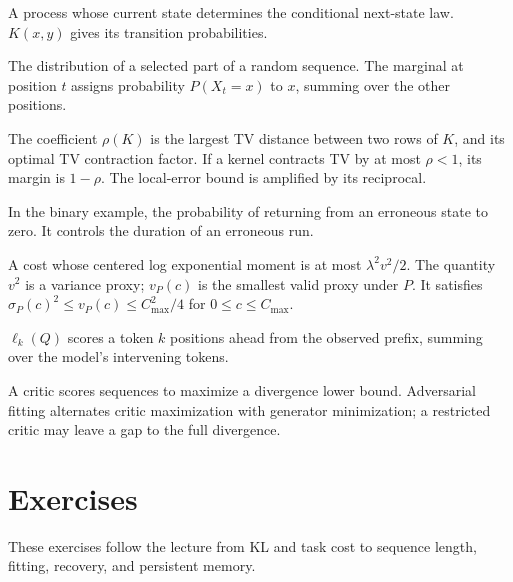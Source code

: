 \documentclass[11pt,twoside]{article}
\theoremstyle{definition}
\theoremstyle{remark}
\begin{document}
\begin{description}[style=nextline,leftmargin=1.5em,labelindent=0pt,
  itemsep=0.15em,parsep=0pt]
A process whose current state determines the conditional next-state
law. \(K(x,y)\) gives its transition probabilities.
\item[Marginal law]
The distribution of a selected part of a random sequence.
The marginal at position \(t\) assigns probability \(P(X_t=x)\)
to \(x\), summing over the other positions.
\item[Dobrushin ergodicity coefficient; contraction margin]
The coefficient \(\rho(K)\) is the largest TV distance between two rows
of \(K\), and its optimal TV contraction factor.
If a kernel contracts TV by at most \(\rho<1\), its margin is
\(1-\rho\). The local-error bound is amplified by its reciprocal.
\item[Recovery]
In the binary example, the probability of returning from an erroneous
state to zero. It controls the duration of an erroneous run.
\item[Subgaussian cost]
A cost whose centered log exponential moment is at most
\(\lambda^2v^2/2\). The quantity \(v^2\) is a variance proxy;
\(v_P(c)\) is the smallest valid proxy under \(P\).
It satisfies \(\sigma_P(c)^2\le v_P(c)\le C_{\max}^2/4\)
for \(0\le c\le C_{\max}\).
\item[\(k\)-step prediction loss]
\(\ell_k(Q)\) scores a token \(k\) positions ahead from the observed
prefix, summing over the model's intervening tokens.
\item[Critic; adversarial fitting]
A critic scores sequences to maximize a divergence lower bound.
Adversarial fitting alternates critic maximization with generator
minimization; a restricted critic may leave a gap to the full divergence.
\end{description}


\clearpage

\section{Exercises}
\label{sec:exercises}

These exercises follow the lecture from KL and task cost to sequence
length, fitting, recovery, and persistent memory.
\exerciseinstructions
\setcounter{courseexercise}{0}
\end{document}
